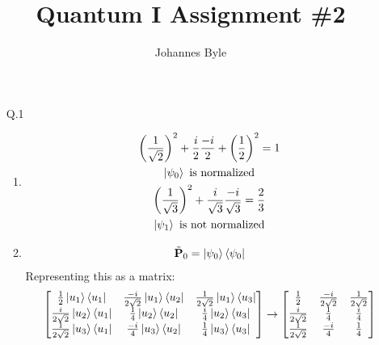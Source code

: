 \documentclass[12pt]{article}
\title{Quantum I Assignment \#2}
\author{Johannes Byle}
\newcommand{\op}[1]{\tilde{\mathbf{#1}}}
\begin{document}
    \maketitle
    \begin{enumerate}
        \item[Q.1]
        \begin{enumerate}
            \item
            \begin{gather*}
                \left(\frac{1}{\sqrt{2}}\right)^2+\frac{i}{2}\frac{-i}{2}+\left(\frac{1}{2}\right)^2=1\\
                \ket{\psi_0}\text{ is normalized}\\
                \left(\frac{1}{\sqrt{3}}\right)^2+\frac{i}{\sqrt{3}}\frac{-i}{\sqrt{3}}=\frac{2}{3}\\
                \ket{\psi_1}\text{ is not normalized}\\
            \end{gather*}
            \item
            \begin{gather*}
                \op{P}_0=\ket{\psi_0}\bra{\psi_0}
            \end{gather*}
            Representing this as a matrix:
            \begin{gather*}
                \begin{bmatrix}
                    \frac{1}{2}\ket{u_1}\bra{u_1}         & \frac{-i}{2\sqrt{2}}\ket{u_1}\bra{u_2} & \frac{1}{2\sqrt{2}}\ket{u_1}\bra{u_3} \\
                    \frac{i}{2\sqrt{2}}\ket{u_2}\bra{u_1} & \frac{1}{4}\ket{u_2}\bra{u_2}          & \frac{i}{4}\ket{u_2}\bra{u_3}         \\
                    \frac{1}{2\sqrt{2}}\ket{u_3}\bra{u_1} & \frac{-i}{4}\ket{u_3}\bra{u_2}         & \frac{1}{4}\ket{u_3}\bra{u_3}         \\
                \end{bmatrix}
                \rightarrow
                \begin{bmatrix}
                    \frac{1}{2}         & \frac{-i}{2\sqrt{2}} & \frac{1}{2\sqrt{2}} \\
                    \frac{i}{2\sqrt{2}} & \frac{1}{4}          & \frac{i}{4}         \\
                    \frac{1}{2\sqrt{2}} & \frac{-i}{4}         & \frac{1}{4}         \\
                \end{bmatrix}

\end{gather*}
\end{enumerate}
\end{enumerate}
\end{document}
